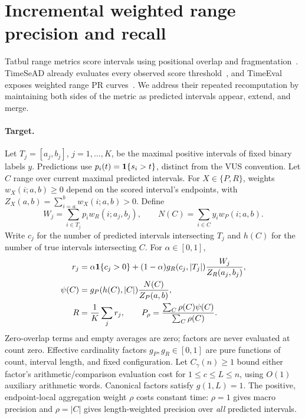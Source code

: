 \section{Incremental weighted range precision and recall}
\label{sec:weighted-range}
Tatbul range metrics score intervals using positional overlap and
fragmentation~\cite{tatbul2018}. TimeSeAD already evaluates every observed
score threshold~\cite{wagner2023timesead,timeseadclassic}, and TimeEval exposes
weighted range PR curves~\cite{timeevalrangecurve2026}. We address their
repeated recomputation by maintaining both sides of the metric as predicted
intervals appear, extend, and merge.

\paragraph{Target.}
Let $T_j=[a_j,b_j]$, $j=1,\ldots,K$, be the maximal positive intervals of
fixed binary labels $y$. Predictions use $p_i(t)=\mathbf{1}\{s_i>t\}$, distinct from
the VUS convention. Let $C$ range over current maximal predicted intervals.
For $X\in\{P,R\}$, weights $w_X(i;a,b)\geq0$ depend on the scored interval's
endpoints, with $Z_X(a,b)=\sum_{i=a}^b w_X(i;a,b)>0$. Define
\[
 W_j=\sum_{i\in T_j}p_iw_R(i;a_j,b_j),\qquad
 N(C)=\sum_{i\in C}y_iw_P(i;a,b).
\]
Write $c_j$ for the number of predicted intervals intersecting $T_j$ and
$h(C)$ for the number of true intervals intersecting $C$. For $\alpha\in[0,1]$,
\begin{align}
 r_j&=\alpha\mathbf{1}\{c_j>0\}
 +(1-\alpha)g_R(c_j,|T_j|)\frac{W_j}{Z_R(a_j,b_j)},\\
 \psi(C)&=g_P(h(C),|C|)\frac{N(C)}{Z_P(a,b)},\\
 R&=\frac1K\sum_jr_j,\qquad
 P_\rho=\frac{\sum_C\rho(C)\psi(C)}{\sum_C\rho(C)}.
\end{align}
Zero-overlap terms and empty averages are zero; factors are never evaluated
at count zero. Effective cardinality factors $g_P,g_R\in[0,1]$ are pure
functions of count, interval length, and fixed configuration. Let
$C_\gamma(n)\geq1$ bound either factor's arithmetic/comparison evaluation cost
for $1\leq c\leq L\leq n$, using $O(1)$ auxiliary arithmetic words.
Canonical factors satisfy $g(1,L)=1$. The positive, endpoint-local aggregation
weight $\rho$ costs constant time: $\rho=1$ gives macro precision and $\rho=|C|$
gives length-weighted precision over \emph{all} predicted intervals.

